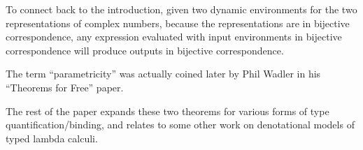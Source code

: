 \documentclass{article}
\begin{document}
To connect back to the introduction, given two dynamic environments for the two representations of
complex numbers, because the representations are in bijective correspondence, any expression
evaluated with input environments in bijective correspondence will produce outputs in bijective
correspondence.

The term ``parametricity'' was actually coined later by Phil Wadler in his ``Theorems for Free''
paper.

The rest of the paper expands these two theorems for various forms of type quantification/binding,
and relates to some other work on denotational models of typed lambda calculi.
\end{document}
